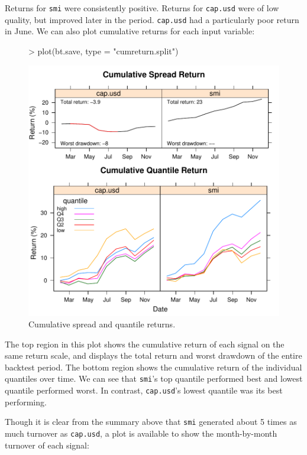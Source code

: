 \documentclass[a4paper]{report}
\begin{document}
\begin{article}
Returns for \texttt{smi} were consistently positive.  Returns for
\texttt{cap.usd} were of low quality, but improved later in the
period.  \texttt{cap.usd} had a particularly poor return in June. We
can also plot cumulative returns for each input variable:

\begin{figure}
\centering
\vspace*{.1in}
\begin{Schunk}
\begin{Sinput}
> plot(bt.save, type = "cumreturn.split")
\end{Sinput}
\end{Schunk}
\includegraphics{backtest-021}
\caption{\label{figure:fanplot}
Cumulative spread and quantile returns.}
\end{figure}

The top region in this plot shows the cumulative return of each signal
on the same return scale, and displays the total return and worst
drawdown of the entire backtest period.  The bottom region shows the
cumulative return of the individual quantiles over time.  We can see
that \texttt{smi}'s top quantile performed best and lowest quantile
performed worst.  In contrast, \texttt{cap.usd}'s lowest quantile was
its best performing.

Though it is clear from the summary above that \texttt{smi} generated
about 5 times as much turnover as \texttt{cap.usd}, a plot is
available to show the month-by-month turnover of each signal:


\end{article}
\end{document}
